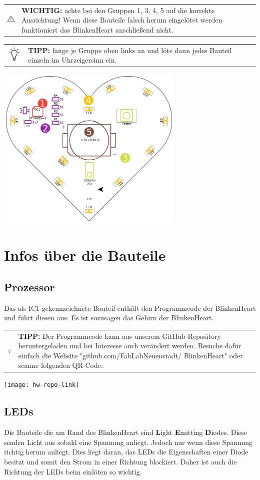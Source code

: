 \documentclass{article} %
\newcommand{\alertwarningbox}[1]{
\begin{center}
	\begin{tabularx}{\linewidth}{
			>{\columncolor{warningbackground}}c
			>{\columncolor{warningbackground}}X}
		\raisebox{\dimexpr2\baselineskip-\height/2-\tabcolsep}
		{\includegraphics[width=1cm]{icons/001-warning}}&
		\raisebox{\tabcolsep}{\strut}\textbf{WICHTIG:} #1\raisebox{-\tabcolsep}{\strut}
	\end{tabularx}
\end{center}
}
\newcommand{\hintbox}[1]{
\begin{center}
	\begin{tabularx}{\linewidth}{
			>{\columncolor{hintbackground}}c
			>{\columncolor{hintbackground}}X}
		\raisebox{\dimexpr2\baselineskip-\height/2-\tabcolsep}
		{\includegraphics[width=1cm]{icons/002-technology}}&
		\raisebox{\tabcolsep}{\strut}\textbf{TIPP:} #1\raisebox{-\tabcolsep}{\strut}
	\end{tabularx}
\end{center}
}
\begin{document}
\alertwarningbox{achte bei den Gruppen 1, 3, 4, 5 auf die korrekte Ausrichtung!
	Wenn diese Bauteile falsch herum eingelötet werden funktioniert das
	BlinkenHeart anschließend nicht.}
\hintbox{fange je Gruppe oben links an und löte dann jedes Bauteil einzeln im Uhrzeigersinn ein.}

\newpage
{}
\vspace*{\fill}
\begin{center}
	\includegraphics[width=9cm]{pcb/solder_order}
\end{center}
\vspace*{\fill}

\newpage
\section{Infos über die Bauteile}
\subsection{Prozessor}
Das als IC1 gekennzeichnete Bauteil enthält den Programmcode der BlinkenHeart und führt diesen aus. Es ist sozusagen das Gehirn der BlinkenHeart.

\hintbox{Der Programmcode kann aus unserem GitHub-Repository heruntergeladen und bei Interesse auch verändert werden. Besuche dafür einfach die Website "github.com/FabLabNeuenstadt/ BlinkenHeart" oder scanne folgenden QR-Code:}
\begin{center}
	\texttt{[image: hw-repo-link]}
\end{center}

\subsection{LEDs}
Die Bauteile die am Rand des BlinkenHeart sind
\textbf{L}ight \textbf{E}mitting \textbf{D}iodes.
Diese senden Licht aus sobald eine Spannung anliegt.
Jedoch nur wenn diese Spannung richtig herum anliegt.
Dies liegt daran, das LEDs die Eigenschaften einer Diode besitzt und
somit den Strom in einer Richtung blockiert.
Daher ist auch die Richtung der LEDs beim einlöten so wichtig.
\end{document}
